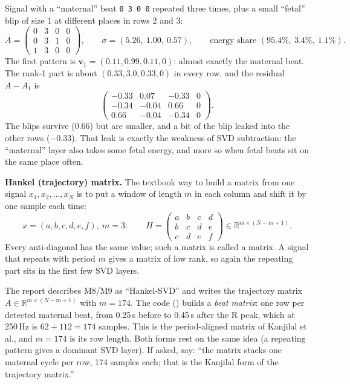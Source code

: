 \documentclass[11pt]{article}
\renewcommand{\file}[1]{\path{#1}}
\begin{document}
\begin{tried}
Signal with a ``maternal'' beat \texttt{0 3 0 0} repeated three times, plus a small ``fetal'' blip of size 1 at different places in rows 2 and 3:
\[
A = \begin{pmatrix} 0 & 3 & 0 & 0\\ 0 & 3 & 1 & 0 \\ 1 & 3 & 0 & 0 \end{pmatrix}, \qquad
\sigma = (5.26,\ 1.00,\ 0.57), \qquad \text{energy share } (95.4\%,\ 3.4\%,\ 1.1\%).
\]
The first pattern is $\mathbf{v}_1 = (0.11, 0.99, 0.11, 0)$: almost exactly the maternal beat. The rank-1 part is about $(0.33, 3.0, 0.33, 0)$ in every row, and the residual $A - A_1$ is
\[
\begin{pmatrix} -0.33 & 0.07 & -0.33 & 0\\ -0.34 & -0.04 & \mathbf{0.66} & 0 \\ \mathbf{0.66} & -0.04 & -0.34 & 0 \end{pmatrix}.
\]
The blips survive (0.66) but are smaller, and a bit of the blip leaked into the other rows ($-0.33$). That leak is exactly the weakness of SVD subtraction: the ``maternal'' layer also takes some fetal energy, and more so when fetal beats sit on the same place often.
\end{tried}

\textbf{Hankel (trajectory) matrix.} The textbook way to build a matrix from one signal $x_1, x_2, \dots, x_N$ is to put a window of length $m$ in each column and shift it by one sample each time:
\[
  x = (a,b,c,d,e,f),\ m = 3: \qquad
  H = \begin{pmatrix} a & b & c & d \\ b & c & d & e \\ c & d & e & f \end{pmatrix} \in \mathbb{R}^{m \times (N-m+1)} .
\]
Every anti-diagonal has the same value; such a matrix is called a  matrix. A signal that repeats with period $m$ gives a matrix of low rank, so again the repeating part sits in the first few SVD layers.

\begin{warn}
The report describes M8/M9 as ``Hankel-SVD'' and writes the trajectory matrix $A \in \mathbb{R}^{m\times(N-m+1)}$ with $m = 174$. The code (\file{src/fecg/methods/svd.py}) builds a \emph{beat matrix}: one row per detected maternal beat, from 0.25\,s before to 0.45\,s after the R peak, which at 250\,Hz is $62 + 112 = 174$ samples. This is the period-aligned matrix of Kanjilal et al., and $m = 174$ is its row length. Both forms rest on the same idea (a repeating pattern gives a dominant SVD layer). If asked, say: ``the matrix stacks one maternal cycle per row, 174 samples each; that is the Kanjilal form of the trajectory matrix.''
\end{warn}
\end{document}
